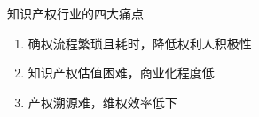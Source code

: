 \documentclass[11pt]{beamer}
\begin{document}
\begin{frame}{知识产权行业的四大痛点}
	\begin{enumerate}
		\item 确权流程繁琐且耗时，降低权利人积极性
		\item 知识产权估值困难，商业化程度低
		\item 产权溯源难，维权效率低下

\end{enumerate}
\end{frame}
\end{document}
